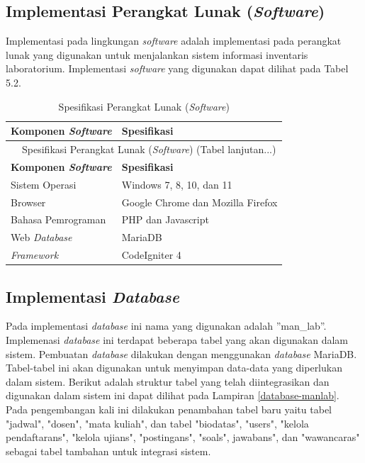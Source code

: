 \subsection{Implementasi Perangkat Lunak (\textit{Software})}
Implementasi pada lingkungan \textit{software} adalah implementasi pada perangkat lunak yang digunakan untuk menjalankan sistem informasi inventaris laboratorium. Implementasi \textit{software} yang digunakan dapat dilihat pada Tabel 5.2.

\begin{longtable}{l l}
	\caption{Spesifikasi Perangkat Lunak (\textit{Software})}                                                               \\
	\hline
	\textbf{ Komponen \textit{Software}} & \textbf{ Spesifikasi}                                                            \\
	\hline
	\endfirsthead

	\multicolumn{2}{c}{\tablename\ \thetable\ {Spesifikasi Perangkat Lunak (\textit{Software})} \space (Tabel lanjutan...)} \\
	\hline
	\textbf{ Komponen \textit{Software}} & \textbf{ Spesifikasi}                                                            \\
	\hline
	\endhead

	Sistem Operasi                       & Windows 7, 8, 10, dan 11                                                         \\
	Browser                              & Google Chrome dan Mozilla Firefox                                                \\
	Bahasa Pemrograman                   & PHP dan Javascript                                                               \\
	Web \textit{Database}                & MariaDB                                                                          \\
	\textit{Framework}                   & CodeIgniter 4                                                                    \\
	\hline
\end{longtable}

\subsection{Implementasi \textit{Database}}
Pada implementasi \textit{database} ini nama yang digunakan adalah ”man\_lab”. Implemenasi \textit{database} ini terdapat beberapa tabel yang akan digunakan dalam sistem. Pembuatan \textit{database} dilakukan dengan menggunakan \textit{database} MariaDB. Tabel-tabel ini akan digunakan untuk menyimpan data-data yang diperlukan dalam sistem. Berikut adalah struktur tabel yang telah diintegrasikan dan digunakan dalam sistem ini dapat dilihat pada Lampiran \ref{database-manlab}. Pada pengembangan kali ini dilakukan penambahan tabel baru yaitu tabel "jadwal", "dosen", "mata kuliah", dan tabel  "biodatas", "users", "kelola pendaftarans", "kelola ujians", "postingans", "soals", jawabans", dan "wawancaras" sebagai tabel tambahan untuk integrasi sistem.

